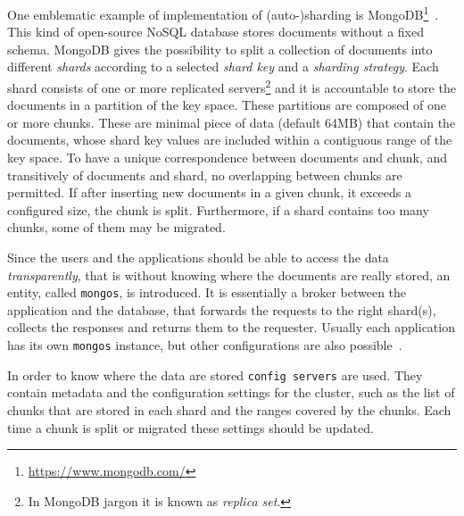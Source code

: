 One emblematic example of implementation of (auto-)sharding is
MongoDB\footnote{\url{https://www.mongodb.com/}}~\cite{bib:mongodb}. This kind
of open-source NoSQL database stores documents without a fixed schema.
MongoDB gives the possibility to split a collection of documents into 
different \emph{shards} according to a selected \emph{shard key} and a 
\emph{sharding strategy}. Each shard consists of one or more replicated 
servers\footnote{In MongoDB jargon it is known as \emph{replica set}.} and
it is accountable to store the documents in a partition of the key space.
These partitions are composed of one or more chunks. These are minimal piece of
data (default 64MB) that contain the documents, whose shard key values are
included within a contiguous range of the key space. To have a unique 
correspondence between documents and chunk, and transitively of documents
and shard, no overlapping between chunks are permitted.
If after inserting new documents in a given chunk, it exceeds a configured
size, the chunk is split. Furthermore, if a shard contains too many chunks,
some of them may be migrated.


Since the users and the applications should be able to access the data 
\emph{transparently}, that is without knowing where the documents are really 
stored, an entity, called \texttt{mongos}, is introduced. It is essentially a 
broker between the application and the database, that forwards the requests to 
the right shard(s), collects the responses and returns them to the requester. 
Usually each application has its own \texttt{mongos} instance, but other 
configurations are also possible~\cite{bib:mongodb}.

In order to know where the data are stored \texttt{config servers} are
used. They contain metadata and the configuration settings for the 
cluster, such as the list of chunks that are stored in each shard and the ranges
covered by the chunks. Each time a chunk is split or migrated these settings
should be updated.

